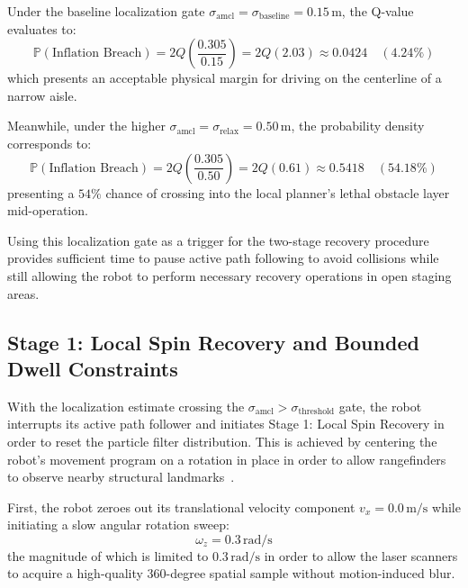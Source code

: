 Under the baseline localization gate $\sigma_{\text{amcl}} = \sigma_{\text{baseline}} = 0.15\,\text{m}$, the Q-value evaluates to:
\begin{equation} \mathbb{P}(\text{Inflation Breach}) = 2 Q\left( \frac{0.305}{0.15} \right) = 2 Q(2.03) \approx 0.0424 \quad (4.24\%) \label{eq:collision_prob_baseline} \end{equation}
which presents an acceptable physical margin for driving on the centerline of a narrow aisle.

Meanwhile, under the higher $\sigma_{\text{amcl}} = \sigma_{\text{relax}} = 0.50\,\text{m}$, the probability density corresponds to:
\begin{equation} \mathbb{P}(\text{Inflation Breach}) = 2 Q\left( \frac{0.305}{0.50} \right) = 2 Q(0.61) \approx 0.5418 \quad (54.18\%) \label{eq:collision_prob_relax} \end{equation}
presenting a $54\%$ chance of crossing into the local planner's lethal obstacle layer mid-operation.

Using this localization gate as a trigger for the two-stage recovery procedure provides sufficient time to pause active path following to avoid collisions while still allowing the robot to perform necessary recovery operations in open staging areas.

\subsection{Stage 1: Local Spin Recovery and Bounded Dwell Constraints}

With the localization estimate crossing the $\sigma_{\text{amcl}} > \sigma_{\text{threshold}}$ gate, the robot interrupts its active path follower and initiates Stage 1: Local Spin Recovery in order to reset the particle filter distribution. This is achieved by centering the robot's movement program on a rotation in place in order to allow rangefinders to observe nearby structural landmarks~\cite{karakaya2026cg}.

First, the robot zeroes out its translational velocity component $v_x = 0.0\,\text{m/s}$ while initiating a slow angular rotation sweep:
\begin{equation} \omega_z = 0.3\,\text{rad/s} \label{eq:spin_velocity_command} \end{equation}
the magnitude of which is limited to $0.3\,\text{rad/s}$ in order to allow the laser scanners to acquire a high-quality 360-degree spatial sample without motion-induced blur.

